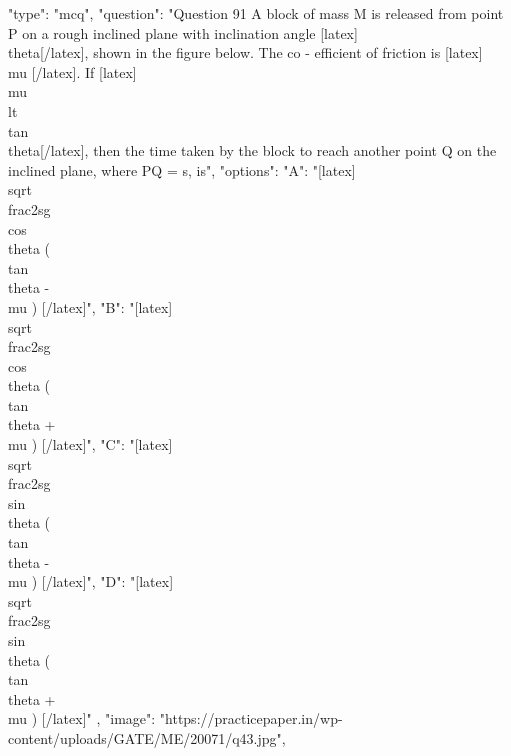  {
    "type": "mcq",
    "question": "Question 91 A block of mass M is released from point P on a rough inclined plane with inclination angle [latex]\\theta[/latex], shown in the figure below. The co - efficient of friction is [latex]\\mu [/latex]. If [latex]\\mu \\lt \\tan\\theta[/latex], then the time taken by the block to reach another point Q on the inclined plane, where PQ = s, is",
    "options": {
      "A": "[latex]\\sqrt{\\frac{2s}{g \\cos\\theta (\\tan \\theta - \\mu ) }}[/latex]",
      "B": "[latex]\\sqrt{\\frac{2s}{g \\cos\\theta (\\tan \\theta + \\mu ) }}[/latex]",
      "C": "[latex]\\sqrt{\\frac{2s}{g \\sin\\theta (\\tan \\theta - \\mu ) }}[/latex]",
      "D": "[latex]\\sqrt{\\frac{2s}{g \\sin\\theta (\\tan \\theta + \\mu ) }}[/latex]"
    },
    "image": "https://practicepaper.in/wp-content/uploads/GATE/ME/20071/q43.jpg",
}
